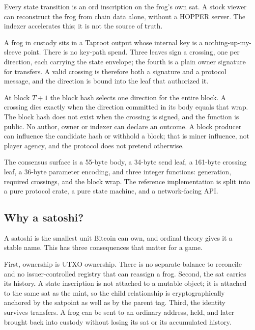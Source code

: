 \begin{description}[leftmargin=1.4em,style=nextline,itemsep=0.35em]
  \item[State on the sat, not beside it.]
  Every state transition is an ord inscription on the frog's own sat. A stock
   viewer can reconstruct the frog from chain data alone, without a
  HOPPER server. The indexer accelerates this; it is not the source of truth.

  \item[Custody by Bitcoin Script.]
  A frog in custody sits in a Taproot output whose internal key is a
  nothing-up-my-sleeve point. There is no key-path spend. Three leaves sign a
  crossing, one per direction, each carrying the state envelope; the fourth
  is a plain owner signature for transfers. A valid crossing is therefore
  both a signature and a protocol message, and the direction is bound into
  the leaf that authorized it.

  \item[Outcomes the author cannot choose.]
  At block $T+1$ the block hash selects one direction for the entire block.
  A crossing dies exactly when the direction committed in its body equals
  that wrap. The block hash does not exist when the crossing is signed, and
  the function is public. No author, owner or indexer can declare an outcome.
  A block producer can influence the candidate hash or withhold a block;
  that is miner influence, not player agency, and the protocol does not
  pretend otherwise.

  \item[An implementation small enough to audit.]
  The consensus surface is a 55-byte body, a 34-byte send leaf, a 161-byte
  crossing leaf, a 36-byte parameter encoding, and three integer functions:
  generation, required crossings, and the block wrap. The reference
  implementation is split into a pure protocol crate, a pure state machine,
  and a network-facing API.
\end{description}

\subsection{Why a satoshi?}

A satoshi is the smallest unit Bitcoin can own, and ordinal theory gives it a
stable name. This has three consequences that matter for a game.

First, ownership is UTXO ownership. There is no separate balance to reconcile
and no issuer-controlled registry that can reassign a frog. Second, the sat
carries its history. A state inscription is not attached to a mutable object;
it is attached to the same sat as the mint, so the child relationship is
cryptographically anchored by the satpoint as well as by the parent tag.
Third, the identity survives transfers. A frog can be sent to an ordinary
address, held, and later brought back into custody without losing its sat or
its accumulated history.

